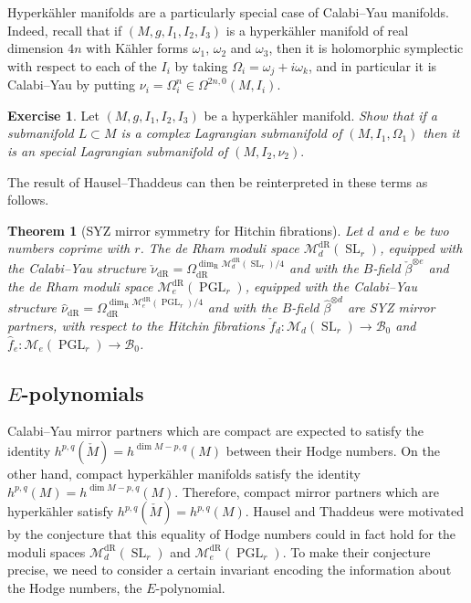 \documentclass[12pt,a4paper]{amsbook}
\newtheorem{thm}{Theorem}[chapter]
\theoremstyle{remark} \newtheorem{rmk}[thm]{Remark}
\theoremstyle{definition} \newtheorem{defn}[thm]{Definition}
\theoremstyle{definition} \newtheorem{ex}[thm]{Example}
\theoremstyle{definition} \newtheorem{ej}{Exercise}
\newcommand{\cB}{\mathcal B}
\newcommand{\cM}{\mathcal M}
\newcommand{\dR}{\mathrm{dR}}
\newcommand{\R}{\mathrm{R}}
\DeclareMathOperator{\SL}{SL}
\DeclareMathOperator{\PGL}{PGL}
\begin{document}
Hyperkähler manifolds are a particularly special case of Calabi--Yau manifolds. Indeed, recall that if $(M,g,I_1,I_2,I_3)$ is a hyperkähler manifold of real dimension $4n$ with Kähler forms $\omega_1$, $\omega_2$ and $\omega_3$, then it is holomorphic symplectic with respect to each of the $I_i$ by taking $\Omega_i=\omega_j + i \omega_k$, and in particular it is Calabi--Yau by putting $\nu_i=\Omega_i^n \in \Omega^{2n,0}(M,I_i)$.

\begin{ej}
Let $(M,g,I_1,I_2,I_3)$ be a hyperkähler manifold. \textit{Show that if a submanifold $L\subset M$ is a complex Lagrangian submanifold of $(M,I_1,\Omega_1)$ then it is an special Lagrangian submanifold of $(M,I_2,\nu_2)$}.
\end{ej}

The result of Hausel--Thaddeus \cite{HauselThaddeus} can then be reinterpreted in these terms as follows.

\begin{thm}[SYZ mirror symmetry for Hitchin fibrations]
  Let $d$ and $e$ be two numbers coprime with $r$.
The de Rham moduli space $\cM^{\dR}_d(\SL_r)$, equipped with the Calabi--Yau structure $\check{\nu}_{\dR}=\Omega_{\dR}^{\dim_\R \cM^{\dR}_d(\SL_r)/4}$ and with the $B$-field $\check{\beta}^{\otimes e}$ and the de Rham moduli space $\cM^{\dR}_e(\PGL_r)$, equipped with the Calabi--Yau structure $\hat{\nu}_{\dR}=\Omega_{\dR}^{\dim_\R \cM^{\dR}_e(\PGL_r)/4}$ and with the $B$-field $\hat{\beta}^{\otimes d}$ are SYZ mirror partners, with respect to the Hitchin fibrations $\check{f}_d:\cM_d(\SL_r) \rightarrow \cB_0$ and $\hat{f}_e: \cM_e(\PGL_r)\rightarrow \cB_0$.
\end{thm}

\subsection*{$E$-polynomials}
Calabi--Yau mirror partners which are compact are expected to satisfy the identity $h^{p,q}(\check{M})=h^{\dim M - p,q}(M)$ between their Hodge numbers. On the other hand, compact hyperkähler manifolds satisfy the identity $h^{p,q}(M)=h^{\dim M - p,q}(M)$. Therefore, compact mirror partners which are hyperkähler satisfy $h^{p,q}(\check{M})=h^{p,q}(M)$. Hausel and Thaddeus were motivated by the conjecture that this equality of Hodge numbers could in fact hold for the moduli spaces $\cM^{\dR}_d(\SL_r)$ and $\cM^{\dR}_e(\PGL_r)$. To make their conjecture precise, we need to consider a certain invariant encoding the information about the Hodge numbers, the $E$-polynomial.
\end{document}
